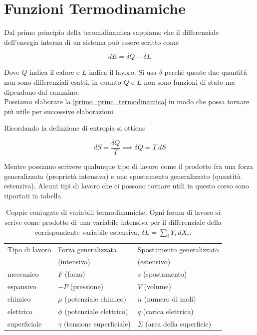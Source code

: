 \chapter{Funzioni Termodinamiche}

Dal primo principio della teromidinamica sappiamo che il differenziale dell'energia interna di un sistema può essere scritto come 

\begin{equation}
    dE = \delta Q - \delta L
    \label{primo_princ_termodinamica}
\end{equation}

Dove $Q$ indica il calore e $L$ indica il lavoro. Si usa $\delta$ perché queste due quantità non sono differenziali esatti, in quanto $Q$ e $L$ non sono funzioni di stato ma dipendono dal cammino.\\

Possiamo elaborare la \eqref{primo_princ_termodinamica} in modo che possa tornare più utile per successive elaborazioni. 

Ricordando la definzione di entropia si ottiene 

\begin{equation}
    dS = \frac{\delta Q}{T} \implies \delta Q = T \ dS
\end{equation}

Mentre possiamo scrivere qualunque tipo di lavoro come il prodotto fra una forza generalizzata (proprietà intensiva) e uno spostamento generalizzato (quantità estensiva).
Alcuni tipi di lavoro che ci possono tornare utili in questo corso sono riportati in tabella\\

\begin{table}[htbp]
    \centering
    \begin{tabular}{lll}
        \toprule
        Tipo di lavoro & Forza generalizzata & Spostamento generalizzato \\
                       & (intensiva)         & (estensivo) \\
        \midrule
        meccanico    & $F$ (forza)                  & $s$ (spostamento)      \\
        espansivo    & $-P$ (pressione)             & $V$ (volume)           \\
        chimico      & $\mu$ (potenziale chimico)   & $n$ (numero di moli)   \\
        elettrico    & $\phi$ (potenziale elettrico)& $q$ (carica elettrica) \\
        superficiale & $\gamma$ (tensione superficiale) & $\Sigma$ (area della superficie) \\
        \bottomrule
    \end{tabular}
    \caption{Coppie coniugate di variabili termodinamiche.
    Ogni forma di lavoro si scrive come prodotto di una variabile intensiva per il differenziale della corrispondente variabile estensiva, $\delta L = \sum_i Y_i\,dX_i$.}
    \label{tab:coppieconiugate}
\end{table}

